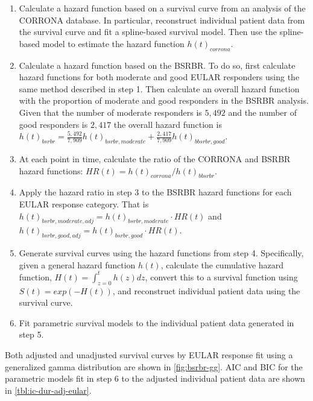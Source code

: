 \documentclass[11pt,final,fleqn]{article}
\theoremstyle{plain}
\begin{document}
\begin{enumerate}
\def\labelenumi{\arabic{enumi}.}
\item Calculate a hazard function based on a survival curve from an analysis
  of the CORRONA database. In particular, reconstruct individual patient
  data from the survival curve \citep{guyot2012enhanced} and fit a
  spline-based survival model. Then use the spline-based model to
  estimate the hazard function $h(t)_{corrona}$.
\item Calculate a hazard function based on the BSRBR. To do so, first
  calculate hazard functions for both moderate and good EULAR responders
  using the same method described in step 1. Then calculate an overall
  hazard function with the proportion of moderate and good responders in
  the BSRBR analysis. Given that the number of moderate responders is
  \(5,492\) and the number of good responders is $2,417$ the overall
  hazard function is $h(t)_{bsrbr} = \frac{5,492}{7,909}h(t)_{bsrbr, moderate} + \frac{2,417}{7,909}h(t)_{bbsrbr, good}$.
\item At each point in time, calculate the ratio of the CORRONA and BSRBR
  hazard functions: $HR(t) = h(t)_{corrona}/h(t)_{bbsrbr}$.
\item Apply the hazard ratio in step 3 to the BSRBR hazard functions for
  each EULAR response category. That is $h(t)_{bsrbr, moderate, adj} = h(t)_{bsrbr, moderate} \cdot HR(t)$ and $h(t)_{bsrbr, good, adj} = h(t)_{bsrbr, good} \cdot HR(t)$.
\item Generate survival curves using the hazard functions from step 4.
  Specifically, given a general hazard function $h(t)$, calculate the
  cumulative hazard function, $H(t) = \int_{z = 0}^{t} h(z)dz$,
  convert this to a survival function using $S(t) = exp(-H(t))$, and
  reconstruct individual patient data using the survival curve.
\item Fit parametric survival models to the individual patient data
  generated in step 5.
\end{enumerate}

Both adjusted and unadjusted survival curves by EULAR response fit using a generalized gamma distribution are shown in \autoref{fig:bsrbr-gg}. AIC and BIC for the parametric models fit in step 6 to the adjusted individual patient data are shown in \autoref{tbl:ic-dur-adj-eular}.
\end{document}
